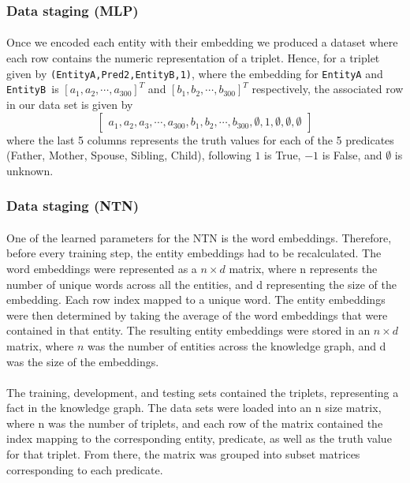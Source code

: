 \documentclass[11.5pt]{article}
\newcommand{\Mat}[1]{\left[\begin{matrix} #1 \end{matrix}\right]}
\begin{document}
\subsubsection{Data staging (MLP)}
\paragraph{}  Once we encoded each entity with their embedding we produced a dataset where each row contains the numeric representation of a triplet. Hence, for a triplet given by \texttt{(EntityA,Pred2,EntityB,1)}, where the embedding for \texttt{EntityA} and \texttt{EntityB }is $[a_1,a_2,\cdots,a_{300}]^T$ and $[b_1,b_2,\cdots,b_{300}]^T$ respectively, the associated row in our data set is given by
$$ \Mat{a_1,a_2,a_3,\cdots,a_{300},b_1,b_2,\cdots,b_{300},\emptyset,1,\emptyset,\emptyset,\emptyset} $$
where the last 5 columns represents the truth values for each of the 5 predicates (Father, Mother, Spouse, Sibling, Child), following $1$ is True, $-1$ is False, and $\emptyset$ is unknown. 

\subsubsection{Data staging (NTN)}
\paragraph{}  One of the learned parameters for the NTN is the word embeddings. Therefore, before every training step, the entity embeddings had to be recalculated. The word embeddings were represented as a $n \times d$ matrix, where n represents the number of unique words across all the entities, and d representing the size of the embedding. Each row index mapped to a unique word. The entity embeddings were then determined by taking the average of the word embeddings that were contained in that entity. The resulting entity embeddings were stored in an $n \times d$ matrix, where $n$ was the number of entities across the knowledge graph, and d was the size of the embeddings.

\paragraph{} The training, development, and testing sets contained the triplets, representing a fact in the knowledge graph. The data sets were loaded into an n size matrix, where n was the number of triplets, and each row of the matrix contained the index mapping to the corresponding entity, predicate, as well as the truth value for that triplet. From there, the matrix was grouped into subset matrices corresponding to each predicate.
\end{document}
